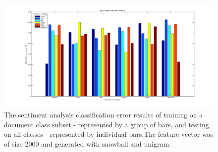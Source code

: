 \begin{figure}[h!]
\centering
\includegraphics[width=1\linewidth]{../Plottar/outofdomain.png}
\caption{The sentiment analysis classification error results of training on a document class subset - represented by a group of bars, and testing on all classes - represented by individual bars.The feature vector was of size 2000 and generated with snowball and unigram. }
\label{fig:outofdomain}
\end{figure}  

